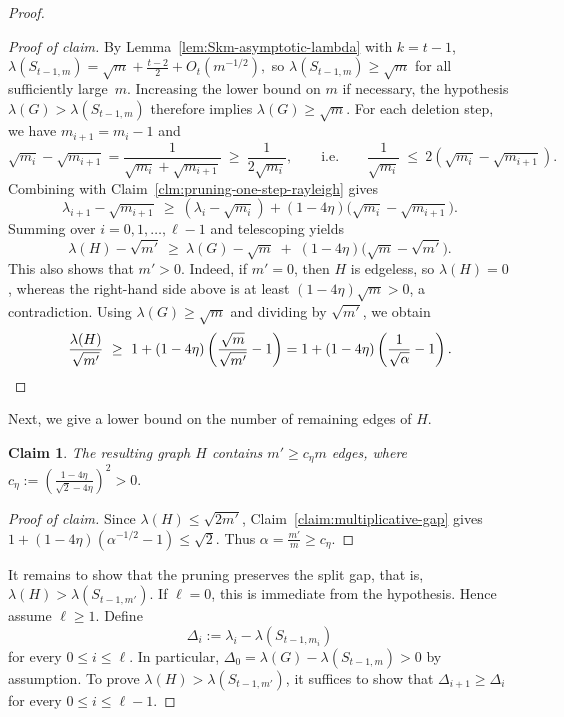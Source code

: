 \documentclass[11pt]{article}
\newtheorem{claim}{Claim}
\theoremstyle{definition}
\theoremstyle{plain}
\newenvironment{poc}{\begin{proof}[Proof of claim]\renewcommand*{\qedsymbol}{$\blacksquare$}}{\end{proof}}
\begin{document}
\begin{proof}
\begin{poc}
By Lemma~\ref{lem:Skm-asymptotic-lambda} with \(k=t-1\), $\lambda(S_{t-1,m})=\sqrt m+\frac{t-2}{2}+O_t(m^{-1/2}),$
 so $\lambda(S_{t-1,m})\ge \sqrt m$
for all sufficiently large~$m$.
Increasing the lower bound on \(m\) if necessary, the hypothesis
\(\lambda(G)>\lambda(S_{t-1,m})\) therefore implies \(\lambda(G)\ge \sqrt m\).
For each deletion step, we have $m_{i+1}=m_i-1$ and 
\[
  \sqrt{m_i}-\sqrt{m_{i+1}}
  =
  \frac{1}{\sqrt{m_i}+\sqrt{m_{i+1}}}
  \ \ge\ \frac{1}{2\sqrt{m_i}},
  \qquad\text{i.e.}\qquad
  \frac{1}{\sqrt{m_i}}\ \le\ 2(\sqrt{m_i}-\sqrt{m_{i+1}}).
\]
Combining with Claim~\ref{clm:pruning-one-step-rayleigh} gives
\[
  \lambda_{i+1}-\sqrt{m_{i+1}}
  \ \ge\
  (\lambda_i-\sqrt{m_i})+(1-4\eta)\bigl(\sqrt{m_i}-\sqrt{m_{i+1}}\bigr).
\]
Summing over $i=0,1,\dots,\ell-1$ and telescoping yields
\[
  \lambda(H)-\sqrt{m'}
  \ \ge\
  \lambda(G)-\sqrt m\;+\;(1-4\eta)\bigl(\sqrt m-\sqrt{m'}\bigr).
\]
This also shows that \(m'>0\). Indeed, if \(m'=0\), then \(H\) is edgeless, so \(\lambda(H)=0\), whereas the right-hand side above is at least \((1-4\eta)\sqrt m>0\), a contradiction.
Using $\lambda(G)\ge \sqrt m$ and dividing by $\sqrt{m'}$, we obtain
\[
  \frac{\lambda(H)}{\sqrt{m'}}
  \ \ge\
  1+(1-4\eta)\left(\frac{\sqrt m}{\sqrt{m'}}-1\right)
  =
  1+(1-4\eta)\left(\frac{1}{\sqrt\alpha}-1\right). \qedhere 
\]
\end{poc}

Next, we give a lower bound on the number of remaining edges of $H$.

\begin{claim} \label{cl:H-linearly-size}
The resulting graph $H$ contains $m' \ge c_{\eta}m$ edges, where        $c_{\eta}:=\left(\frac{1-4\eta}{\sqrt{2} - 4\eta}\right)^2>0.$
\end{claim}

\begin{poc}
Since $\lambda(H)\le \sqrt{2m'}$,
Claim~\ref{claim:multiplicative-gap} gives  
$1 + (1- 4\eta ) (\alpha^{-1/2} - 1) \le \sqrt{2}.$
Thus $\alpha=\frac{m'}{m}\ge c_{\eta}.$
\end{poc}
 
It remains to show that the pruning preserves the split gap, that is, $\lambda(H)>\lambda(S_{t-1,m'}).$
If \(\ell=0\), this is immediate from the hypothesis. Hence assume \(\ell\ge1\).
Define
\[
        \Delta_i := \lambda_i- \lambda(S_{t-1,m_i})
\]
for every $0\le i\le \ell$. 
In particular, $\Delta_0=\lambda(G)- \lambda(S_{t-1,m})>0$ by assumption. 
To prove $\lambda(H) > \lambda (S_{t-1,m'})$, it suffices to show that $\Delta_{i+1} \ge \Delta_i$ for every \(0\le i\le \ell-1\).


\end{proof}
\end{document}
